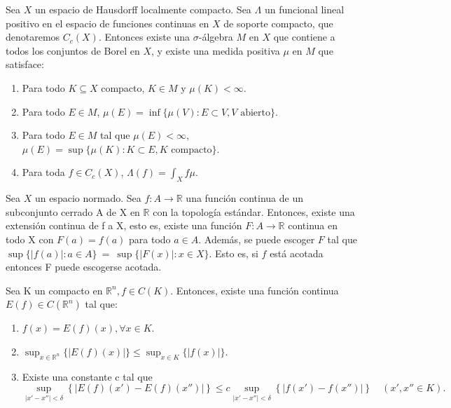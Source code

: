 \begin{teorema}\label{thm:h04}
Sea $X$ un espacio de Hausdorff localmente compacto. Sea $\Lambda$ un funcional lineal positivo en el espacio de funciones continuas en $X$ de soporte compacto, que denotaremos $C_{c}(X)$. Entonces existe una $\sigma$-álgebra $M$ en $X$ que contiene a todos los conjuntos de Borel en $X$, y existe una medida positiva $\mu$ en $M$ que satisface:
\begin{enumerate}
	\item Para todo $K\subseteq X$ compacto, $K\in M$ y $\mu (K)<\infty$.
	\item Para todo $E\in M$, $\mu (E) = \inf\{\mu (V) : E \subset V, V \text{ abierto}\}$.

	\item Para todo $E\in M$ tal que $\mu (E) < \infty$, $\mu (E) = \sup\{\mu (K): K\subset E, K \text{ compacto}\}$.
	\item Para toda $f\in C_{c}(X)$, $\Lambda (f) = \int_{X}f\mu$.
\end{enumerate}
\end{teorema}
\begin{teorema}\label{thm:h07}
 Sea $X$ un espacio normado. Sea \(f:A\to \mathds{R}\) una función continua de un subconjunto cerrado A de X en \(\mathds{R}\) con la topología estándar. Entonces, existe una extensión continua de f a X, esto es, existe una función \(F:A\to \mathbb{R}\) continua en todo X con \(F(a) = f(a)\) para todo \(a\in A\). Además, se puede escoger \(F\) tal que \(\sup\{|f(a)|:a\in A\}~=~\sup\{|F(x)|:x\in X\} \). Esto es, si \(f\) está acotada entonces F puede escogerse acotada.
\end{teorema}


\begin{lema}\label{lm:p01}
Sea K un compacto en \(\mathds{R}^{n}, f \in C(K)\). Entonces, existe una función continua \(E(f)\in C(\mathds{R}^{n})\) tal que: 
\begin{enumerate}
	\item \(f(x) = E(f)(x), \forall x \in K\).
	\item \( \sup_{x\in \mathds{R}^{n}}\{\vert E(f)(x)\vert\} \leq \sup_{x\in K} \{\vert f(x)\vert\}\).
	\item Existe una constante c tal que \[ \sup_{\vert x'-x''\vert < \delta}\left\{ \vert E(f)(x') - E(f)(x'')\vert \right\} \leq c \sup_{\vert x'-x'' \vert < \delta} \left\{\vert f(x')-f(x'')\vert\right\} \quad ( x',x''\in K).\]
\end{enumerate}
\end{lema}

